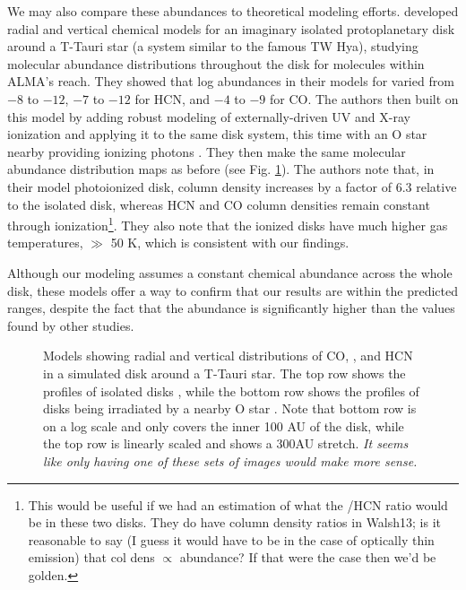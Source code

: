 We may also compare these abundances to theoretical modeling efforts. \citet{Walsh2010} developed radial and vertical chemical models for an imaginary isolated protoplanetary disk around a T-Tauri star (a system similar to the famous TW Hya), studying molecular abundance distributions throughout the disk for molecules within ALMA's reach. They showed that log abundances in their models for \hco varied from $-8$ to $-12$, $-7$ to $-12$ for HCN, and $-4$ to $-9$ for CO. The authors then built on this model by adding robust modeling of externally-driven UV and X-ray ionization \citep{Walsh2012} and applying it to the same disk system, this time with an O star nearby providing ionizing photons \citep{Walsh2013}. They then make the same molecular abundance distribution maps as before (see Fig. \ref{fig:walsh-abundance-profs}). The authors note that, in their model photoionized disk, \hco column density increases by a factor of 6.3 relative to the isolated disk, whereas HCN and CO column densities remain constant through ionization\footnote{This would be useful if we had an estimation of what the \hco/HCN ratio would be in these two disks. They do have column density ratios in Walsh13; is it reasonable to say (I guess it would have to be in the case of optically thin emission) that col dens $\propto$ abundance? If that were the case then we'd be golden.}. They also note that the ionized disks have much higher gas temperatures, $\gg$ 50 K, which is consistent with our findings.


Although our modeling assumes a constant chemical abundance across the whole disk, these models offer a way to confirm that our results are within the predicted ranges, despite the fact that the \hco abundance is significantly higher than the values found by other studies.



\begin{figure}[t]
  \hspace*{\fill}%
  \vfill%
  \hspace*{\fill}%
  \caption{Models showing radial and vertical distributions of CO, \hco, and HCN in a simulated disk around a T-Tauri star. The top row shows the profiles of isolated disks \citep{Walsh2010}, while the bottom row shows the profiles of disks being irradiated by a nearby O star \citep{Walsh2013}. Note that bottom row is on a log scale and only covers the inner 100 AU of the disk, while the top row is linearly scaled and shows a 300AU stretch. \textit{It seems like only having one of these sets of images would make more sense.}}
  \label{fig:walsh-abundance-profs}
\end{figure}





